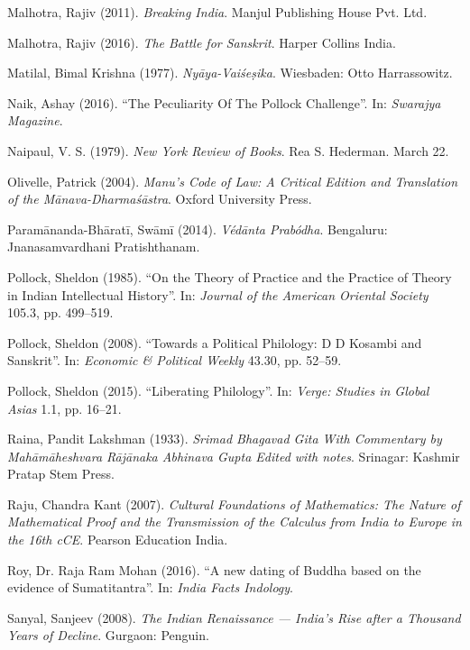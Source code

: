 \begin{thebibliography}{99}
Malhotra, Rajiv (2011). {\sl Breaking India}. Manjul Publishing House Pvt. Ltd.

Malhotra, Rajiv (2016). {\sl The Battle for Sanskrit}. Harper Collins India.

Matilal, Bimal Krishna (1977). {\sl Nyāya-Vaiśeṣika}. Wiesbaden: Otto Harrassowitz.

Naik, Ashay (2016). ``The Peculiarity Of The Pollock Challenge''. In: {\sl Swarajya Magazine}.

Naipaul, V. S. (1979). {\sl New York Review of Books}. Rea S. Hederman. March 22.

Olivelle, Patrick (2004). {\sl Manu’s Code of Law: A Critical Edition and Translation of the Mānava-Dharmaśāstra}. Oxford University Press.

Paramānanda-Bhāratī, Swāmī (2014). {\sl Védānta Prabódha}. Bengaluru: Jnanasamvardhani Pratishthanam.

Pollock, Sheldon (1985). ``On the Theory of Practice and the Practice of Theory in Indian Intellectual History''. In: {\sl Journal of the American Oriental Society} 105.3, pp. 499--519.

Pollock, Sheldon (2008). ``Towards a Political Philology: D D Kosambi and Sanskrit''. In: {\sl Economic \& Political Weekly} 43.30, pp. 52--59.

Pollock, Sheldon  (2015). ``Liberating Philology''. In: {\sl Verge: Studies in Global Asias} 1.1, pp. 16--21.

Raina, Pandit Lakshman (1933). {\sl Srimad Bhagavad Gita With Commentary by Mahāmāheshvara Rājānaka Abhinava Gupta Edited with notes}. Srinagar: Kashmir Pratap Stem Press.

Raju, Chandra Kant (2007). {\sl Cultural Foundations of Mathematics: The Nature of Mathematical Proof and the Transmission of the Calculus from India to Europe in the 16th cCE}. Pearson Education India.

Roy, Dr. Raja Ram Mohan (2016). ``A new dating of Buddha based on the evidence of Sumatitantra''. In: {\sl India Facts Indology}.

Sanyal, Sanjeev (2008). {\sl The Indian Renaissance --- India's Rise after a Thousand Years of Decline}. Gurgaon: Penguin.


\end{thebibliography}
